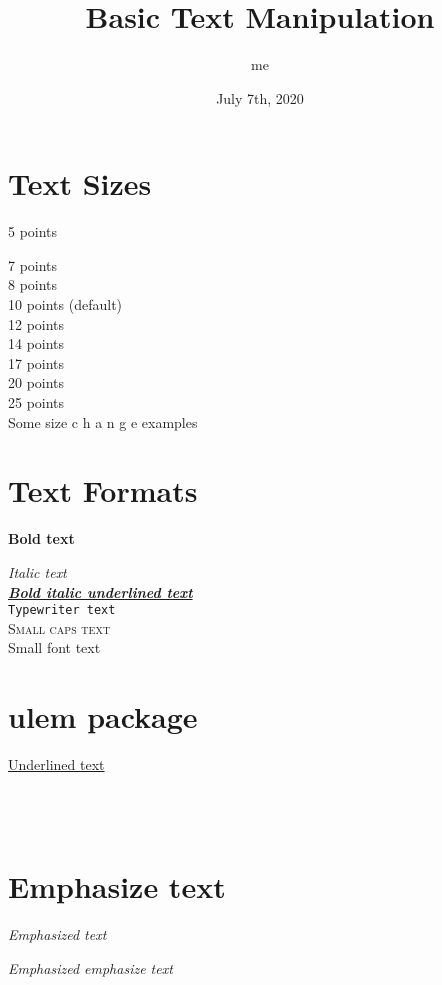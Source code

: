 \documentclass{article}
\title{Basic Text Manipulation}
\author{me}
\date{July 7th, 2020}
\begin{document}
    \maketitle %

    \section{Text Sizes}
    {\tiny 5 points} \\ \raggedright
    {\scriptsize 7 points} \\
    {\footnotesize 8 points} \\
    {\normalsize 10 points (default)} \\
    {\large 12 points} \\
    {\Large 14 points} \\
    {\LARGE 17 points} \\
    {\huge 20 points} \\
    {\Huge 25 points} \\
    \normalsize Some size {\LARGE c h a n g e} examples
    \\[2\baselineskip]


    \section{Text Formats}
    \textbf{Bold text} \\ \raggedright
    \textit{Italic text} \\
    \textbf{\textit{\underline{Bold italic underlined text}}} \\
    \texttt{Typewriter text} \\
    \textsc{Small caps text} \\
    \textsf{Small font text}
    \\[2\baselineskip]

    
    \section{ulem package}
    \underline{Underlined text} \\ \raggedright
     \\
    \\[2\baselineskip]
    \normalem %


    \section{Emphasize text}
    \emph{Emphasized text} \\ \raggedright
    \emph{Emphasized \emph{emphasize} text}
    \\[2\baselineskip]
\end{document}
